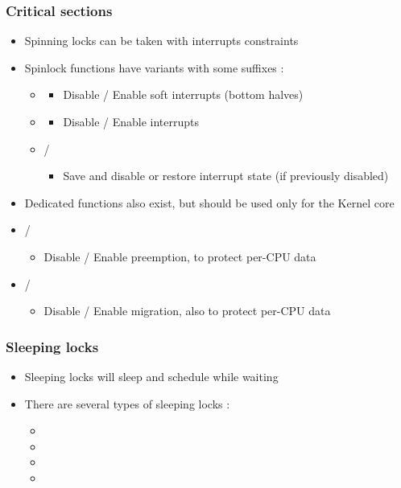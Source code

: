 \begin{frame}
	\frametitle{Critical sections}
	\begin{itemize}
		\item Spinning locks can be taken with interrupts constraints
		\item Spinlock functions have variants with some suffixes :
		\begin{itemize}
		\item {}
			\begin{itemize}
				\item Disable / Enable soft interrupts (bottom halves)
			\end{itemize}
		\item {}
			\begin{itemize}
				\item Disable / Enable interrupts
			\end{itemize}
		\item {} / 
			\begin{itemize}
				\item Save and disable or restore interrupt state (if previously disabled)
			\end{itemize}
		\end{itemize}
		\item Dedicated functions also exist, but should be used only for the Kernel core
		\item {} / 
			\begin{itemize}
				\item Disable / Enable preemption, to protect per-CPU data
			\end{itemize}
		\item {} / 
			\begin{itemize}
				\item Disable / Enable migration, also to protect per-CPU data
			\end{itemize}

	\end{itemize}
\end{frame}

\begin{frame}
  \frametitle{Sleeping locks}
	\begin{itemize}
		\item Sleeping locks will sleep and schedule while waiting
		\item There are several types of sleeping locks :
	\begin{itemize}
		\item {}
		\item {}
		\item {}
		\item {}
	\end{itemize}
	\end{itemize}
\end{frame}

